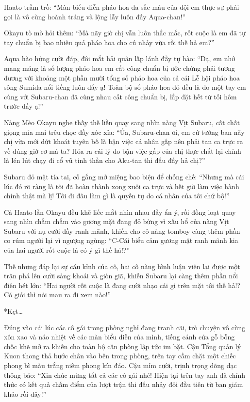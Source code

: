 \documentclass[../main.tex]{subfiles}
\begin{document}
Haato trầm trồ: ``Màn biểu diễn pháo hoa đa sắc màu của đội em thực sự phải gọi là vô cùng hoành tráng và lộng lẫy luôn đấy Aqua-chan!''

Okayu tò mò hỏi thêm: ``Mà nãy giờ chị vẫn luôn thắc mắc, rốt cuộc là em đã tự tay chuẩn bị bao nhiêu quả pháo hoa cho cú nhảy vừa rồi thế hả em?''

Aqua hào hứng cười đáp, đôi mắt hải quân lấp lánh đầy tự hào: ``Dạ, em nhớ mang máng là số lượng pháo hoa em cất công chuẩn bị ước chừng phải tương đương với khoảng một phần mười tổng số pháo hoa của cả cái Lễ hội pháo hoa sông Sumida nổi tiếng luôn đấy ạ! Toàn bộ số pháo hoa đó đều là do một tay em cùng với Subaru-chan đã cùng nhau cất công chuẩn bị, lắp đặt hết từ tối hôm trước đấy ạ!''

Nàng Mèo Okayu nghe thấy thế liền quay sang nhìn nàng Vịt Subaru, cất chất giọng mỉa mai trêu chọc đầy xóc xỉa: ``Ủa, Subaru-chan ơi, em cứ tưởng ban nãy chị vừa mới dứt khoát tuyên bố là bận việc cá nhân gấp nên phải tan ca trực ra về đúng giờ cơ mà ta? Hóa ra cái lý do bận việc gấp của chị thực chất lại chính là lén lút chạy đi cổ vũ tinh thần cho Aku-tan thi đấu đấy hả chị?''

Subaru đỏ mặt tía tai, cố gắng mở miệng bao biện để chống chế: ``Nhưng mà cái lúc đó rõ ràng là tôi đã hoàn thành xong xuôi ca trực và hết giờ làm việc hành chính thật mà lị! Tôi đi đâu làm gì là quyền tự do cá nhân của tôi chứ bộ!''

Cả Haato lẫn Okayu đều khẽ liếc mắt nhìn nhau đầy ẩn ý, rồi đồng loạt quay sang nhìn chằm chằm vào gương mặt đang đỏ bừng vì xấu hổ của nàng Vịt Subaru với nụ cười đầy ranh mãnh, khiến cho cô nàng tomboy càng thêm phần co rúm người lại vì ngượng ngùng: ``C-Cái biểu cảm gương mặt ranh mãnh kia của hai người rốt cuộc là có ý gì thế hả!?''

Thế nhưng đáp lại sự cáu kỉnh của cô, hai cô nàng bình luận viên lại được một trận phá lên cười sảng khoái và giòn giã, khiến Subaru lại càng thêm phần nổi điên hét lớn: ``Hai người rốt cuộc là đang cười nhạo cái gì trên mặt tôi thế hả!? Có giỏi thì nói mau ra đi xem nào!''

*Kẹt\dots*

Đúng vào cái lúc các cô gái trong phòng nghỉ đang tranh cãi, trò chuyện vô cùng xôn xao và náo nhiệt về các màn biểu diễn của mình, tiếng cánh cửa gỗ bỗng chốc khẽ mở ra khiến cho toàn bộ căn phòng lập tức im bặt. Cậu Tổng quản lý Kuon thong thả bước chân vào bên trong phòng, trên tay cầm chặt một chiếc phong bì màu trắng niêm phong kín đáo. Cậu mỉm cười, trịnh trọng dõng dạc thông báo: ``Xin chúc mừng tất cả các cô gái nhé! Hiện tại trên tay anh đã chính thức có kết quả chấm điểm của lượt trận thi đấu nhảy đôi đầu tiên từ ban giám khảo rồi đây!''
\end{document}

